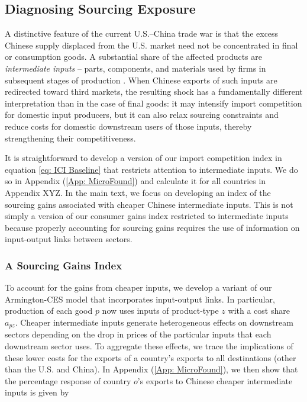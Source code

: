 \documentclass[english,12pt]{article}
\theoremstyle{definition}
\let\oldref\ref
\renewcommand{\ref}[1]{(\oldref{#1})}
\begin{document}
\subsection{Diagnosing Sourcing Exposure}

A distinctive feature of the current U.S.--China trade war is that the
excess Chinese supply displaced from the U.S. market need not be
concentrated in final or consumption goods. A substantial share of the
affected products are \emph{intermediate inputs} -- parts, components, and
materials used by firms in subsequent stages of production \citep[cf.,][]{bown2019measuring}. When Chinese exports of such inputs are redirected toward third markets, the resulting
shock has a fundamentally different interpretation than in the case of final
goods: it may intensify import competition for domestic input producers, but
it can also relax sourcing constraints and reduce costs for domestic
downstream users of those inputs, thereby strengthening their
competitiveness.

It is straightforward to develop a version of our import competition index in 
equation \eqref{eq: ICI Baseline} that restricts attention to intermediate inputs.
We do so in Appendix \ref{App: MicroFound} and calculate it for all countries
in Appendix XYZ. In the main text, we focus on developing an index of the 
sourcing gains associated with cheaper Chinese intermediate inputs. This is 
not simply a version of our consumer gains index restricted to intermediate
inputs because properly accounting for sourcing gains requires the use of 
information on input-output links between sectors.

\subsubsection*{A Sourcing Gains Index}

To account for the gains from cheaper inputs, we develop a variant of our 
Armington-CES model that incorporates input-output links. In particular, 
production of each good $p$ now uses inputs of product-type $z$ with a 
cost share $a_{pz}$. Cheaper intermediate inputs generate heterogeneous
effects on downstream sectors depending on the drop in prices of the 
particular inputs that each downstream sector uses. To aggregate these 
effects, we trace the implications of these lower costs for the exports
of a country's exports to all destinations (other than the U.S. and
China). In Appendix \ref{App: MicroFound}, we then show that 
the percentage response of country $o$'s exports to Chinese cheaper 
intermediate inputs is given by
\end{document}
